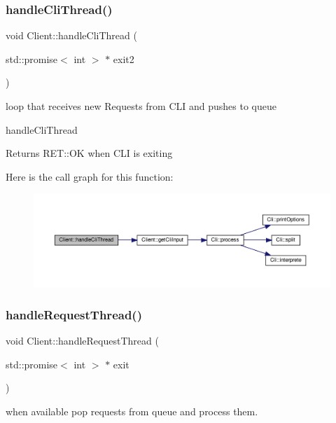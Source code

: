\subsubsection{\texorpdfstring{handle\+Cli\+Thread()}{handleCliThread()}}
{\footnotesize\ttfamily void Client\+::handle\+Cli\+Thread (\begin{DoxyParamCaption}\item[{std\+::promise$<$ int $>$ $\ast$}]{exit2 }\end{DoxyParamCaption})}



loop that receives new Requests from C\+LI and pushes to queue 

handle\+Cli\+Thread \begin{DoxyReturn}{Returns}
R\+E\+T\+::\+OK when C\+LI is exiting 
\end{DoxyReturn}
Here is the call graph for this function\+:\nopagebreak
\begin{figure}[H]
\begin{center}
\leavevmode
\includegraphics[width=350pt]{classClient_a8030bdb7d7857907110ad45883b01511_cgraph}
\end{center}
\end{figure}
\mbox{\label{classClient_a39187196db33ecd252c342fffa7039ef}} 
\subsubsection{\texorpdfstring{handle\+Request\+Thread()}{handleRequestThread()}}
{\footnotesize\ttfamily void Client\+::handle\+Request\+Thread (\begin{DoxyParamCaption}\item[{std\+::promise$<$ int $>$ $\ast$}]{exit }\end{DoxyParamCaption})}



when available pop requests from queue and process them. 

